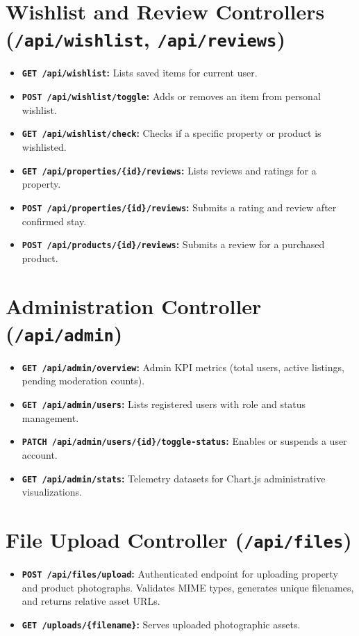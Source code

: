 \section{Wishlist and Review Controllers (\texttt{/api/wishlist}, \texttt{/api/reviews})}
\begin{itemize}
    \item \textbf{\texttt{GET /api/wishlist}:} Lists saved items for current user.
    \item \textbf{\texttt{POST /api/wishlist/toggle}:} Adds or removes an item from personal wishlist.
    \item \textbf{\texttt{GET /api/wishlist/check}:} Checks if a specific property or product is wishlisted.
    \item \textbf{\texttt{GET /api/properties/\{id\}/reviews}:} Lists reviews and ratings for a property.
    \item \textbf{\texttt{POST /api/properties/\{id\}/reviews}:} Submits a rating and review after confirmed stay.
    \item \textbf{\texttt{POST /api/products/\{id\}/reviews}:} Submits a review for a purchased product.
\end{itemize}

\section{Administration Controller (\texttt{/api/admin})}
\begin{itemize}
    \item \textbf{\texttt{GET /api/admin/overview}:} Admin KPI metrics (total users, active listings, pending moderation counts).
    \item \textbf{\texttt{GET /api/admin/users}:} Lists registered users with role and status management.
    \item \textbf{\texttt{PATCH /api/admin/users/\{id\}/toggle-status}:} Enables or suspends a user account.
    \item \textbf{\texttt{GET /api/admin/stats}:} Telemetry datasets for Chart.js administrative visualizations.
\end{itemize}

\section{File Upload Controller (\texttt{/api/files})}
\begin{itemize}
    \item \textbf{\texttt{POST /api/files/upload}:} Authenticated endpoint for uploading property and product photographs. Validates MIME types, generates unique filenames, and returns relative asset URLs.
    \item \textbf{\texttt{GET /uploads/\{filename\}}:} Serves uploaded photographic assets.
\end{itemize}

